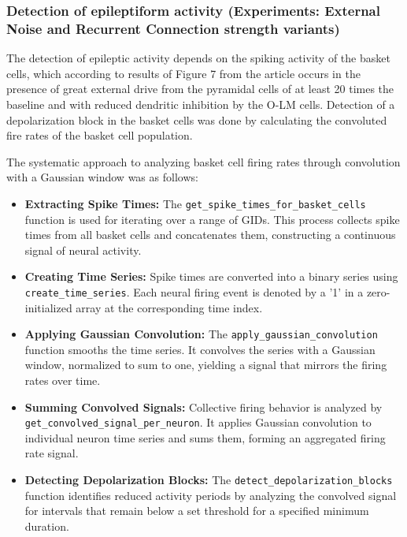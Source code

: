 \subsubsection{Detection of epileptiform activity (Experiments: External Noise and Recurrent Connection strength variants)}
The detection of epileptic activity depends on the spiking activity of the
basket cells, which according to results of Figure 7 from the
\textcite{sanjayImpairedDendriticInhibition2015} article occurs in the presence
of great external drive from the pyramidal cells of at least 20 times the
baseline and with reduced dendritic inhibition by the O-LM cells. Detection of a
depolarization block in the basket cells was done by calculating the convoluted
fire rates of the basket cell population.


\noindent The systematic approach to analyzing basket cell firing rates through convolution with a Gaussian window was as follows:
\begin{itemize}
    \item \textbf{Extracting Spike Times:} The \lstinline{get_spike_times_for_basket_cells}
          function is used for iterating over a range of GIDs. This process collects spike times from
          all basket cells and concatenates them, constructing a continuous signal of neural activity.

    \item \textbf{Creating Time Series:} Spike times are converted into a binary series
          using \lstinline{create_time_series}. Each neural firing event is denoted by a '1' in a
          zero-initialized array at the corresponding time index.

    \item \textbf{Applying Gaussian Convolution:} The \lstinline{apply_gaussian_convolution}\newline
          function smooths the time series. It convolves the series with a Gaussian window, normalized
          to sum to one, yielding a signal that mirrors the firing rates over time.

    \item \textbf{Summing Convolved Signals:} Collective firing behavior is analyzed by
          \lstinline{get_convolved_signal_per_neuron}. It applies Gaussian convolution to individual
          neuron time series and sums them, forming an aggregated firing rate signal.

    \item \textbf{Detecting Depolarization Blocks:} The \lstinline{detect_depolarization_blocks}
          function identifies reduced activity periods by analyzing the convolved signal for intervals
          that remain below a set threshold for a specified minimum duration.
\end{itemize}

